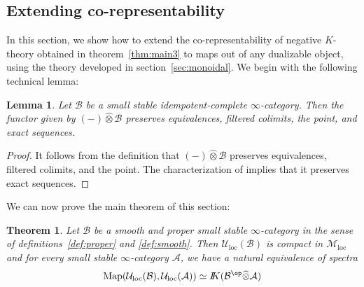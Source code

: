 \documentclass{amsart}
\newcommand{\htp}{\simeq}
\newcommand{\cA}{{\mathcal A}}
\newcommand{\cB}{{\mathcal B}}
\newcommand{\cM}{{\mathcal M}}
\newcommand{\cU}{{\mathcal U}}
\let\catsymbfont\mathcal
\newcommand{\aA}{{\catsymbfont{A}}}
\newcommand{\aB}{{\catsymbfont{B}}}
\newcommand{\bbK}{I\mspace{-6.mu}K}
\newcommand{\idemtimes}{\widehat{\otimes}}
\newcommand{\Map}{\mathrm{Map}}%
\renewcommand{\i}{\infty}
\newcommand{\Motloc}{\cM_\mathrm{loc}}
\newcommand{\Uloc}{\cU_{\mathrm{loc}}}
\numberwithin{equation}{section}
\newtheorem{theorem}[equation]{Theorem}
\newtheorem{lemma}[equation]{Lemma}
\theoremstyle{definition}
\begin{document}
\subsection{Extending co-representability}

In this section, we show how to extend the co-representability of
negative $K$-theory obtained in theorem~\ref{thm:main3} to maps out of
any dualizable object, using the theory developed in
section~\ref{sec:monoidal}.  We begin with the following technical
lemma:

\begin{lemma}\label{lem:preserve}
Let $\cB$ be a small stable idempotent-complete $\i$-category.  Then
the functor given by $(-) \idemtimes \cB$ preserves equivalences,
filtered colimits, the point, and exact sequences.
\end{lemma}

\begin{proof}
It follows from the definition that $(-) \idemtimes \cB$ preserves
equivalences, filtered colimits, and the point.  The characterization
of \cite[6.3.1.16]{HAG} implies that it preserves exact sequences.
\end{proof}

We can now prove the main theorem of this section:

\begin{theorem}\label{thm:main34gen}
Let $\cB$ be a smooth and proper small stable $\infty$-category in the
sense of definitions~\ref{def:proper} and \ref{def:smooth}.  Then
$\Uloc(\cB)$ is compact in $\Motloc$ and for every small stable
$\i$-category $\cA$, we have a natural equivalence of
spectra 
\[
\Map(\Uloc(\cB),\Uloc(\cA)) \htp \bbK(\aB^{\op} \idemtimes \aA)
\]
\end{theorem}
\end{document}
